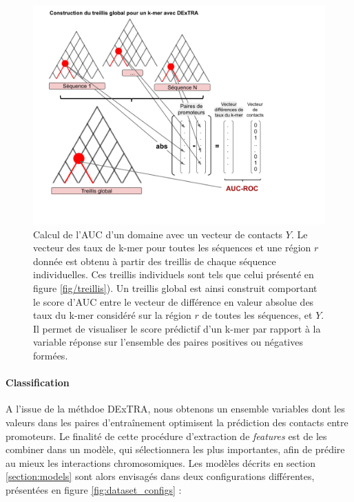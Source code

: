 \documentclass[french]{llncs}
\begin{document}
\begin{figure}[h]
\begin{center}
 	\includegraphics[width=1\linewidth]{Images_Dextra/Treillis_global_DExTRA.png}
 \caption{Calcul de l'AUC d'un domaine avec un vecteur de contacts $Y$. Le vecteur des taux de k-mer pour toutes les séquences et une région $r$ donnée est obtenu à partir des treillis de chaque séquence individuelles. Ces treillis individuels sont tels que celui présenté en figure \ref{fig/treillis}). Un treillis global est ainsi construit comportant le score d'AUC entre le vecteur de différence en valeur absolue des taux du k-mer considéré sur la région $r$ de toutes les séquences, et $Y$. Il permet de visualiser le score prédictif d'un k-mer par rapport à la variable réponse sur l'ensemble des paires positives ou négatives formées.}
 \label{fig:treillis_global_dextra}
\end{center}
\end{figure}

\paragraph{Classification}

A l'issue de la méthdoe DExTRA, nous obtenons un ensemble variables dont les valeurs dans les paires d'entraînement optimisent la prédiction des contacts entre promoteurs. Le finalité de cette procédure d'extraction de \textit{features} est de les combiner dans un modèle, qui sélectionnera les plus importantes, afin de prédire au mieux les interactions chromosomiques. Les modèles décrits en section \ref{section:models} sont alors envisagés dans deux configurations différentes, présentées en figure \ref{fig:dataset_configs} :
\end{document}
